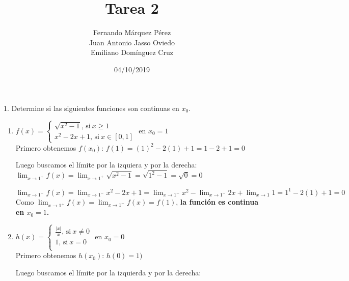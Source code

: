 \documentclass[12pt]{article}
\title{Tarea 2}
\author{Fernando Márquez Pérez \\ Juan Antonio Jasso Oviedo \\ Emiliano Dom\'inguez Cruz}
\date{04/10/2019}
\affil{Facultad de Ciencias\\UNAM}
\begin{document}
\begin{titlepage}
    \maketitle
\end{titlepage}

1. Determine si las siguientes funciones son continuas en \(x_0\).

\begin{enumerate}[\hspace{9px} a)]
    \item
    \( f(x)=
    \begin{cases}
        \sqrt{x^2-1}\text{, si} \ x \geq 1\\
        x^2-2x+1\text{, si} \ x \in [0,1]
    \end{cases}
    \)
    en $x_0 = 1$\\

        Primero obtenemos $f(x_0)$: \quad \(f(1) = (1)^2-2(1)+1 = 1-2+1 = 0\)

        Luego buscamos el l\'imite por la izquiera y por la derecha:\\

        \(\displaystyle\lim_{x \to 1^+}f(x)=\lim_{x \to 1^+}\sqrt{x^2-1} = \sqrt{1^2-1} = \sqrt{0} = 0\)

        \(\displaystyle\lim_{x \to 1^-}f(x)=\lim_{x \to 1^-}x^2-2x+1 = \lim_{x \to 1^-}x^2 -\lim_{x \to 1^-}2x + \lim_{x \to 1}1 = 1^1-2(1)+1=0\)\\

        Como \(\displaystyle\lim_{x \to 1^+}f(x)=\lim_{x \to 1^-}f(x)=f(1)\), \textbf{la funci\'on es continua en $x_0=1$.}\\

    \item
    \( h(x)=
    \begin{cases}
        \frac{|x|}{x}\text{, si} \ x \neq 0\\
        1\text{, si} \ x=0\\
    \end{cases}
    \)
    en $x_0=0$\\

        Primero obtenemos $h(x_0)$: \quad \(h(0) = 1)\)

        Luego buscamos el l\'imite por la izquierda y por la derecha:\\


\end{enumerate}
\end{document}
